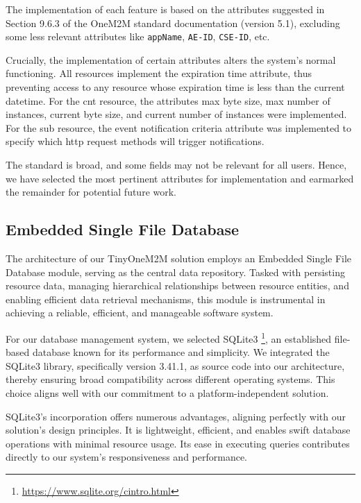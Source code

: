 \documentclass[a4paper,fleqn]{cas-dc}
\begin{document}
The implementation of each feature is based on the attributes suggested in Section 9.6.3 of the OneM2M standard documentation (version 5.1), excluding some less relevant attributes like \texttt{appName}, \texttt{AE-ID}, \texttt{CSE-ID}, etc.

Crucially, the implementation of certain attributes alters the system's normal functioning. All resources implement the expiration time attribute, thus preventing access to any resource whose expiration time is less than the current datetime. For the \gls{cnt} resource, the attributes max byte size, max number of instances, current byte size, and current number of instances were implemented. For the \gls{sub} resource, the event notification criteria attribute was implemented to specify which \gls{http} request methods will trigger notifications.

The standard is broad, and some fields may not be relevant for all users. Hence, we have selected the most pertinent attributes for implementation and earmarked the remainder for potential future work.

\subsection{Embedded Single File Database}

The architecture of our TinyOneM2M solution employs an Embedded Single File Database module, serving as the central data repository. Tasked with persisting resource data, managing hierarchical relationships between resource entities, and enabling efficient data retrieval mechanisms, this module is instrumental in achieving a reliable, efficient, and manageable software system.

For our database management system, we selected SQLite3 \footnote{\url{https://www.sqlite.org/cintro.html}}, an established file-based database known for its performance and simplicity. We integrated the SQLite3 library, specifically version 3.41.1, as source code into our architecture, thereby ensuring broad compatibility across different operating systems. This choice aligns well with our commitment to a platform-independent solution.

SQLite3's incorporation offers numerous advantages, aligning perfectly with our solution's design principles. It is light\-weight, efficient, and enables swift database operations with minimal resource usage. Its ease in executing queries contributes directly to our system's responsiveness and performance.
\end{document}
